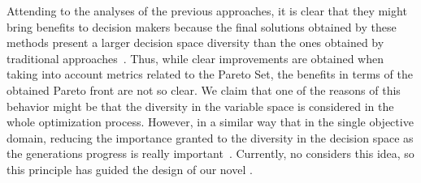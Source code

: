 Attending to the analyses of the previous approaches, it is clear that they might bring benefits to decision makers
because the final solutions obtained by these methods present a larger decision space diversity than the ones obtained
by traditional approaches~\cite{deb2005omni, rudolph2007capabilities}.
%
Thus, while clear improvements are obtained when taking into account metrics related to the Pareto Set, the benefits in terms of the 
obtained Pareto front are not so clear.
%
We claim that one of the reasons of this behavior might be that the diversity in the variable space is considered 
in the whole optimization process.
%
However, in a similar way that in the single objective domain, reducing the importance granted to the diversity in the decision space as the generations progress is really important~\cite{Joel:MULTI_DYNAMIC}.
%
Currently, no \MOEA{} considers this idea, so this principle has guided the design of our novel \MOEA{}.

